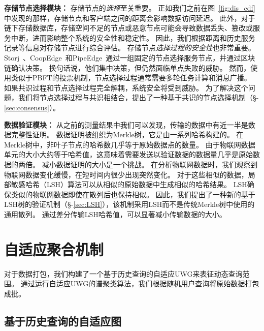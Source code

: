 \textbf{存储节点选择模块：}
存储节点的\textit{选择}至关重要。
正如我们之前在图~\autoref{fig:dis_cdf}中发现的那样，存储节点和客户端之间的距离会影响数据访问延迟。
此外，对于链下存储数据库，存储空间不足的节点或恶意节点可能会导致数据丢失、篡改或服务中断，进而影响整个系统的安全性和稳定性。
因此，我们根据距离和历史服务记录等信息对存储节点进行综合评估。
存储节点\textit{选择过程的安全性}也非常重要。
Storj~\cite{storj2018storj}、CoopEdge~\cite{yuan2021coopedge}和PipeEdge~\cite{yuan2023pipeedge}通过一组固定的节点选择服务节点，并通过区块链确认决策。
换句话说，他们集中决策，但仍然面临单点失败的威胁。
然而，使用类似于PBFT的投票机制，节点选择过程通常需要多轮任务计算和消息广播。
如果共识过程和节点选择过程完全解耦，系统安全将受到威胁。
为了解决这个问题，我们将节点选择过程与共识相结合，提出了一种基于共识的节点选择机制（§-\ref{sec:consensus}）。

\textbf{数据验证模块：}
从之前的测量结果中我们可以发现，传输的数据中有近一半是数据完整性证明。
数据证明被组织为Merkle树，它是由一系列哈希构建的。
在Merkle树中，非叶子节点的哈希数几乎等于原始数据点的数量。
由于物联网数据单元的大小大约等于哈希值，这意味着需要发送以验证数据的数据量几乎是原始数据的两倍。
减小数据证明的大小是一个挑战。
在分析物联网数据时，我们观察到物联网数据变化缓慢，在短时间内很少出现突然变化。
对于这些相似的数据，局部敏感哈希（LSH）算法可以从相似的原始数据中生成相似的哈希结果。
LSH确保类似的物联网数据即使在散列后也保持相似。
因此，我们提出了一种新的基于LSH树的验证机制（§-\ref{sec:LSH}），该机制采用LSH而不是传统Merkle树中使用的通用散列。
通过差分传输LSH哈希值，可以显著减小传输数据的大小。

\chapter{自适应聚合机制}
\label{sec:packaging}

对于数据打包，我们构建了一个基于历史查询的自适应UWG来表征动态查询范围。
通过运行自适应UWG的谱聚类算法，我们根据随机用户查询将原始数据打包成批。

\section{基于历史查询的自适应图}
\label{sec:UWG}

